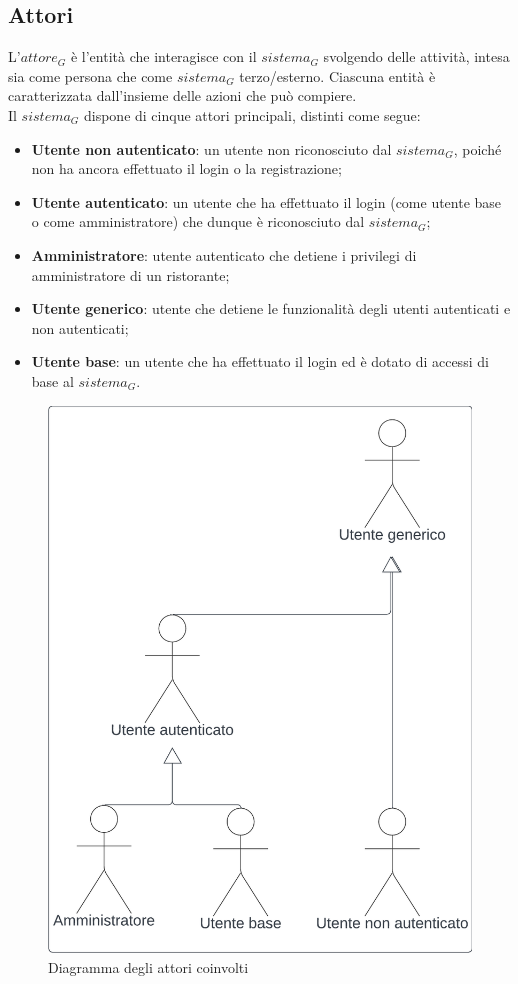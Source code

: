 \documentclass[12pt, oneside]{article}
\begin{document}
\subsection{Attori}
L'$\textit{attore}_G$ è l'entità che interagisce con il $\textit{sistema}_G$ svolgendo delle attività, intesa sia come persona che come $\textit{sistema}_G$ terzo/esterno. Ciascuna entità è caratterizzata dall’insieme delle azioni che può compiere. \\
Il $\textit{sistema}_G$ dispone di cinque attori principali, distinti come segue:
\begin{itemize}
    \item \textbf{Utente non autenticato}: un utente non riconosciuto dal $\textit{sistema}_G$, poiché non ha ancora  effettuato il login o la registrazione;
    \item \textbf{Utente autenticato}: un utente che ha effettuato il login (come utente base o come amministratore) che dunque è riconosciuto dal $\textit{sistema}_G$;
    \item \textbf{Amministratore}: utente autenticato che detiene i privilegi di amministratore di un ristorante;
    \item \textbf{Utente generico}: utente che detiene le funzionalità degli utenti autenticati e non autenticati;
    \item \textbf{Utente base}: un utente che ha effettuato il login ed è dotato di accessi di base al $\textit{sistema}_G$.
\end{itemize}

\begin{figure}[H]
\centering
\includegraphics[width=0.4\linewidth]{Attori_coinvolti.png}
\caption{Diagramma degli attori coinvolti}
\end{figure}
\newpage


\end{document}
